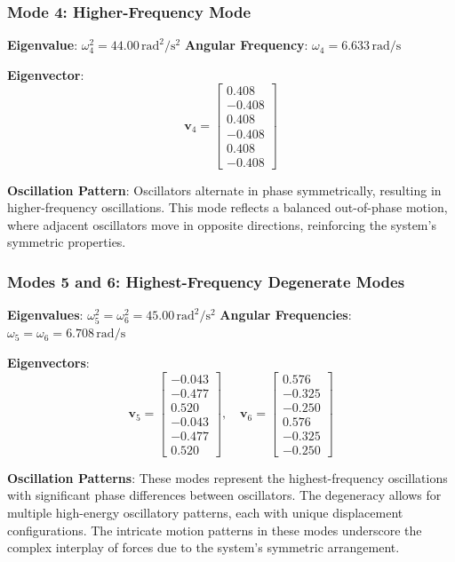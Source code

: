 \documentclass[12pt]{report} %
\begin{document}
\subsubsection{Mode 4: Higher-Frequency Mode}
\label{subsubsec:part4_mode4}

\textbf{Eigenvalue}: \( \omega_4^2 = 44.00 \, \text{rad}^2/\text{s}^2 \)  
\textbf{Angular Frequency}: \( \omega_4 = 6.633 \, \text{rad/s} \)

\textbf{Eigenvector}:
\[
\mathbf{v}_4 = \begin{bmatrix}
0.408 \\
-0.408 \\
0.408 \\
-0.408 \\
0.408 \\
-0.408
\end{bmatrix}
\]

\textbf{Oscillation Pattern}:  
Oscillators alternate in phase symmetrically, resulting in higher-frequency oscillations. This mode reflects a balanced out-of-phase motion, where adjacent oscillators move in opposite directions, reinforcing the system's symmetric properties.

\subsubsection{Modes 5 and 6: Highest-Frequency Degenerate Modes}
\label{subsubsec:part4_modes5_6}

\textbf{Eigenvalues}: \( \omega_5^2 = \omega_6^2 = 45.00 \, \text{rad}^2/\text{s}^2 \)  
\textbf{Angular Frequencies}: \( \omega_5 = \omega_6 = 6.708 \, \text{rad/s} \)

\textbf{Eigenvectors}:
\[
\mathbf{v}_5 = \begin{bmatrix}
-0.043 \\
-0.477 \\
0.520 \\
-0.043 \\
-0.477 \\
0.520
\end{bmatrix},
\quad
\mathbf{v}_6 = \begin{bmatrix}
0.576 \\
-0.325 \\
-0.250 \\
0.576 \\
-0.325 \\
-0.250
\end{bmatrix}
\]

\textbf{Oscillation Patterns}:  
These modes represent the highest-frequency oscillations with significant phase differences between oscillators. The degeneracy allows for multiple high-energy oscillatory patterns, each with unique displacement configurations. The intricate motion patterns in these modes underscore the complex interplay of forces due to the system's symmetric arrangement.
\end{document}
